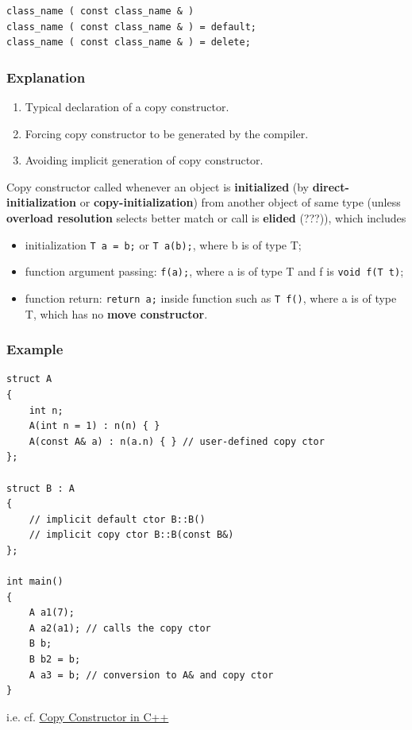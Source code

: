 \documentclass[10pt]{amsart}
\begin{document}
\begin{multicols*}{2}
\begin{lstlisting}
class_name ( const class_name & )  
class_name ( const class_name & ) = default;  
class_name ( const class_name & ) = delete;
\end{lstlisting}  

\subsubsection{Explanation}  
\begin{enumerate}
\item Typical declaration of a copy constructor.  
\item Forcing copy constructor to be generated by the compiler.  
\item Avoiding implicit generation of copy constructor.  
\end{enumerate}


Copy constructor called whenever an object is \textbf{initialized} (by \textbf{direct-initialization} or \textbf{copy-initialization}) from another object of same type (unless \textbf{overload resolution} selects better match or call is \textbf{elided} (???)), which includes  
\begin{itemize}
\item initialization \verb|T a = b;| or \verb|T a(b);|, where b is of type T;  
\item function argument passing: \verb|f(a);|, where a is of type T and f is \verb|void f(T t)|;  
\item function return: \verb|return a;| inside function such as \verb|T f()|, where a is of type T, which has no \textbf{move constructor}.   
\end{itemize}

\subsubsection{Example}  

\begin{lstlisting}
struct A
{
	int n;
	A(int n = 1) : n(n) { }
	A(const A& a) : n(a.n) { } // user-defined copy ctor
};

struct B : A
{
	// implicit default ctor B::B()
	// implicit copy ctor B::B(const B&)
};

int main()
{
	A a1(7);
	A a2(a1); // calls the copy ctor
	B b;
	B b2 = b;
	A a3 = b; // conversion to A& and copy ctor  
}
\end{lstlisting}  

i.e. cf. \href{http://www.geeksforgeeks.org/copy-constructor-in-cpp/}{Copy Constructor in C++}


\end{multicols*}
\end{document}
